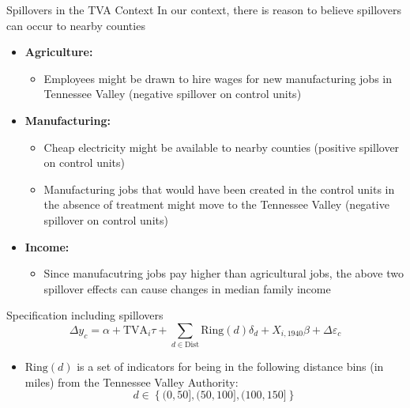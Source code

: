 \documentclass[aspectratio=169]{beamer}
\begin{document}
\begin{frame}{Spillovers in the TVA Context}
    In our context, there is reason to believe spillovers can occur to nearby counties

    \begin{itemize}
        \item \textbf{Agriculture:} 
        \begin{itemize}
            \item Employees might be drawn to hire wages for new manufacturing jobs in Tennessee Valley (negative spillover on control units)
        \end{itemize}
        
        \item \textbf{Manufacturing:}
        \begin{itemize}
            \item Cheap electricity might be available to nearby counties (positive spillover on control units) 
            
            \item Manufacturing jobs that would have been created in the control units in the absence of treatment might move to the Tennessee Valley (negative spillover on control units)
        \end{itemize}
        
        \item \textbf{Income:} 
        \begin{itemize}
            \item Since manufacutring jobs pay higher than agricultural jobs, the above two spillover effects can cause changes in median family income
        \end{itemize}
    \end{itemize}
\end{frame}

\begin{frame}{Specification including spillovers}
    \begin{equation}
        \Delta y_c = \alpha + \text{TVA}_i \tau + \sum_{d \in \text{Dist}} \text{Ring}(d)\delta_d + X_{i, 1940} \beta + \Delta \varepsilon_c
    \end{equation} 

    \begin{itemize}
        \item $\text{Ring}(d)$ is a set of indicators for being in the following distance bins (in miles) from the Tennessee Valley Authority: 
        \[ d \in \left\{ (0, 50], (50, 100], (100, 150] \right\} \]
    \end{itemize}
\end{frame}
\end{document}
